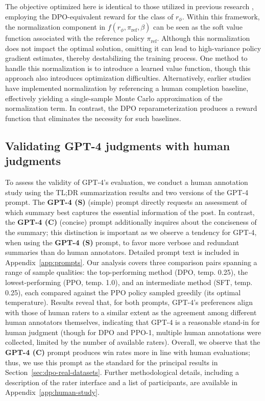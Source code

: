 The objective optimized here is identical to those utilized in previous research 
\citep{ziegler2020finetuning, stiennon2022learning, bai2022training, ouyang2022training}, employing the DPO-equivalent reward for the class of $r_{\phi}$. Within this framework, the normalization component in $f(r_{\phi}, \pi_\text{ref}, \beta)$ can be seen as the soft value function associated with the reference policy $\pi_\text{ref}$. Although this normalization does not impact the optimal solution, omitting it can lead to high-variance policy gradient estimates, thereby destabilizing the training process. One method to handle this normalization is to introduce a learned value function, though this approach also introduces optimization difficulties. Alternatively, earlier studies have implemented normalization by referencing a human completion baseline, effectively yielding a single-sample Monte Carlo approximation of the normalization term. In contrast, the DPO reparameterization produces a reward function that eliminates the necessity for such baselines.

\subsection{Validating GPT-4 judgments with human judgments}
\label{sec:human-judgments}
To assess the validity of GPT-4’s evaluation, we conduct a human annotation study using the TL;DR summarization results and two versions of the GPT-4 prompt. The \textbf{GPT-4 (S)} (simple) prompt directly requests an assessment of which summary best captures the essential information of the post. In contrast, the \textbf{GPT-4 (C)} (concise) prompt additionally inquires about the conciseness of the summary; this distinction is important as we observe a tendency for GPT-4, when using the \textbf{GPT-4 (S)} prompt, to favor more verbose and redundant summaries than do human annotators. Detailed prompt text is included in Appendix~\ref{app:prompts}. Our analysis covers three comparison pairs spanning a range of sample qualities: the top-performing method (DPO, temp. 0.25), the lowest-performing (PPO, temp. 1.0), and an intermediate method (SFT, temp. 0.25), each compared against the PPO policy sampled greedily (its optimal temperature). Results reveal that, for both prompts, GPT-4’s preferences align with those of human raters to a similar extent as the agreement among different human annotators themselves, indicating that GPT-4 is a reasonable stand-in for human judgment (though for DPO and PPO-1, multiple human annotations were collected, limited by the number of available raters). Overall, we observe that the \textbf{GPT-4 (C)} prompt produces win rates more in line with human evaluations; thus, we use this prompt as the standard for the principal results in Section~\ref{sec:dpo-real-datasets}. Further methodological details, including a description of the rater interface and a list of participants, are available in Appendix~\ref{app:human-study}.

